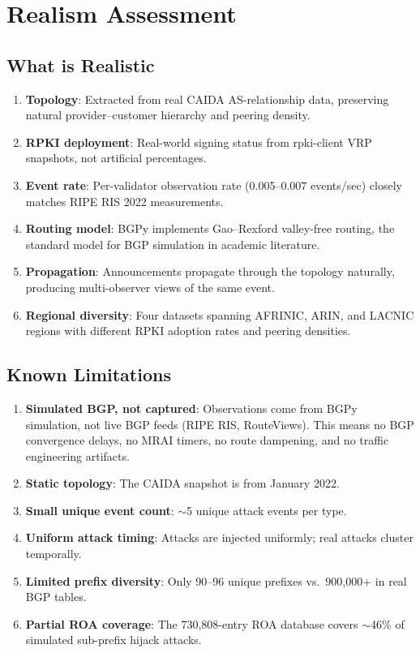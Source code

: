 \documentclass[11pt,a4paper]{article}
\begin{document}
\section{Realism Assessment}

\subsection{What is Realistic}

\begin{enumerate}
    \item \textbf{Topology}: Extracted from real CAIDA AS-relationship data, preserving
          natural provider--customer hierarchy and peering density.
    \item \textbf{RPKI deployment}: Real-world signing status from rpki-client VRP
          snapshots, not artificial percentages.
    \item \textbf{Event rate}: Per-validator observation rate (0.005--0.007 events/sec)
          closely matches RIPE RIS 2022 measurements.
    \item \textbf{Routing model}: BGPy implements Gao--Rexford valley-free routing,
          the standard model for BGP simulation in academic literature.
    \item \textbf{Propagation}: Announcements propagate through the topology naturally,
          producing multi-observer views of the same event.
    \item \textbf{Regional diversity}: Four datasets spanning AFRINIC, ARIN, and LACNIC
          regions with different RPKI adoption rates and peering densities.
\end{enumerate}

\subsection{Known Limitations}

\begin{enumerate}
    \item \textbf{Simulated BGP, not captured}: Observations come from BGPy simulation,
          not live BGP feeds (RIPE RIS, RouteViews). This means no BGP convergence
          delays, no MRAI timers, no route dampening, and no traffic engineering
          artifacts.
    \item \textbf{Static topology}: The CAIDA snapshot is from January 2022.
    \item \textbf{Small unique event count}: $\sim$5 unique attack events per type.
    \item \textbf{Uniform attack timing}: Attacks are injected uniformly; real attacks
          cluster temporally.
    \item \textbf{Limited prefix diversity}: Only 90--96 unique prefixes vs.\ 900,000+
          in real BGP tables.
    \item \textbf{Partial ROA coverage}: The 730,808-entry ROA database covers
          $\sim$46\% of simulated sub-prefix hijack attacks.
\end{enumerate}
\end{document}
